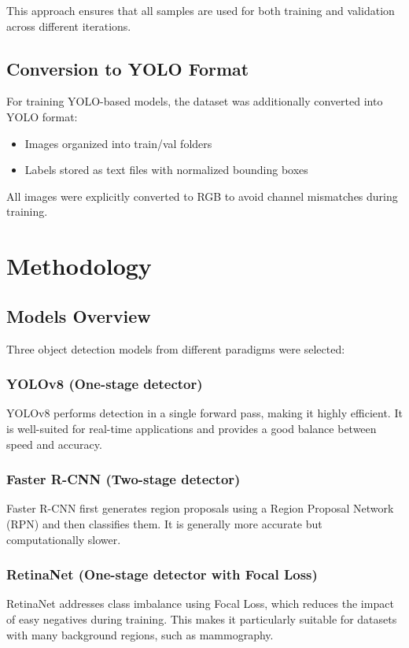 \documentclass[12pt,a4paper]{article} %
\begin{document}
This approach ensures that all samples are used for both training and validation across different iterations.

\subsection{Conversion to YOLO Format}
For training YOLO-based models, the dataset was additionally converted into YOLO format:
\begin{itemize}
  \item Images organized into train/val folders
  \item Labels stored as text files with normalized bounding boxes
\end{itemize}

All images were explicitly converted to RGB to avoid channel mismatches during training.

\section{Methodology}
\subsection{Models Overview}
Three object detection models from different paradigms were selected:

\subsubsection{YOLOv8 (One-stage detector)}
YOLOv8 performs detection in a single forward pass, making it highly efficient. It is well-suited for real-time applications and provides a good balance between speed and accuracy.

\subsubsection{Faster R-CNN (Two-stage detector)}
Faster R-CNN first generates region proposals using a Region Proposal Network (RPN) and then classifies them. It is generally more accurate but computationally slower.

\subsubsection{RetinaNet (One-stage detector with Focal Loss)}
RetinaNet addresses class imbalance using Focal Loss, which reduces the impact of easy negatives during training. This makes it particularly suitable for datasets with many background regions, such as mammography.
\end{document}
